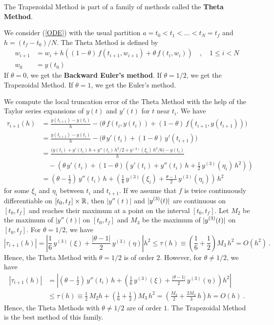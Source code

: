 \begin{rmk}
The Trapezoidal Method is part of a family of methods called the
{\bfseries Theta Method}.

We consider (\ref{ODE}) with the usual partition
$a=t_0 < t_1 < \ldots < t_N = t_f$ and $h=(t_f-t_0)/N$.
The Theta Method is defined by
\begin{align*}
w_{i+1} &= w_i + h \left( (1-\theta)\,f(t_{i+1},w_{i+1}) +
\theta\,f(t_i,w_i) \right)
\quad, \quad 1 \leq i < N \\
w_0 &= y(t_0)
\end{align*}
If $\theta = 0$, we get the
{\bfseries Backward Euler's method}.  If 
$\theta = 1/2$, we get the Trapezoidal Method.   If
$\theta = 1$, we get the Euler's method.

We compute the local truncation error of the Theta Method with the help of
the Taylor series expansions of $y(t)$ and $y'(t)$ for $t$ near $t_i$.
We have
\begin{align*}
\tau_{i+1}(h) &= \frac{y(t_{i+1}) - y(t_i)}{h} - \big(
\theta\,f(t_i,y(t_i)) + (1-\theta)\,f(t_{i+1},y(t_{i+1})) \big) \\
&= \frac{y(t_{i+1}) - y(t_i)}{h} -
\big( \theta\,y'(t_i) + (1-\theta)\,y'(t_{i+1}) \big) \\
&= \frac{ \big( y(t_i) + y'(t_i)\,h + y''(t_i)\,h^2/2 +
y^{(3)}(\xi_i)\,h^3/6 \big) - y(t_i)}{h} \\
& \quad - \left( \theta\,y'(t_i) + (1-\theta)
\left(  y'(t_i) + y''(t_i)\,h + \frac{1}{2}\,y^{(3)}(\eta_i)\,h^2
\right) \right) \\
&= \left( \theta-\frac{1}{2} \right)\,y''(t_i)\,h +
\left( \frac{1}{6}\,y^{(3)}(\xi_i) + \frac{\theta -1}{2}\,y^{(3)}(\eta_i)
\right) \, h^2
\end{align*}
for some $\xi_i$ and $\eta_i$ between $t_i$ and $t_{i+1}$.
If we assume that $f$ is twice continuously differentiable on
$[t_0,t_f]\times \mathbb{R}$, then $|y''(t)|$ and $\displaystyle |y^{(3)}(t)|$ are
continuous on $[t_0,t_f]$ and reaches their maximum at a point on the
interval $[t_0,t_f]$.  Let $M_2$ be the maximum of $|y''(t)|$ on
$[t_0,t_f]$ and $M_3$ be the maximum of $\displaystyle |y^{(3)}(t)|$
on $[t_0,t_f]$.  For $\theta = 1/2$, we have
\[
|\tau_{i+1}(h)|
= \left| \frac{1}{6}\,y^{(3)}(\xi) + \frac{|\theta -1|}{2}\,y^{(3)}(\eta)
\right| h^2 \leq \tau(h) \equiv
\left( \frac{1}{6} + \frac{1}{2} \right) M_3 \, h^2
= O(h^2) \ .
\]
Hence, the Theta Method with $\theta = 1/2$ is of order $2$.
However, for $\theta \neq 1/2$, we have
\begin{align*}
|\tau_{i+1}(h)|
& = \left| \left( \theta-\frac{1}{2} \right)\,y''(t_i)\,h
+ \left( \frac{1}{6}\,y^{(3)}(\xi) + \frac{|\theta -1|}{2}\,y^{(3)}(\eta)
\right) h^2 \right| \\
&\leq \tau(h) \equiv
\frac{1}{2}\,M_2 h + \left( \frac{1}{6} + \frac{1}{2} \right) M_3 \, h^2
= \left(\frac{M_2}{2} + \frac{2M_3}{3}\,h \right) h
= O(h) \ .
\end{align*}
Hence, the Theta Methods with $\theta \neq 1/2$ are of order $1$.
The Trapezoidal Method is the best method of this family.
\end{rmk}

